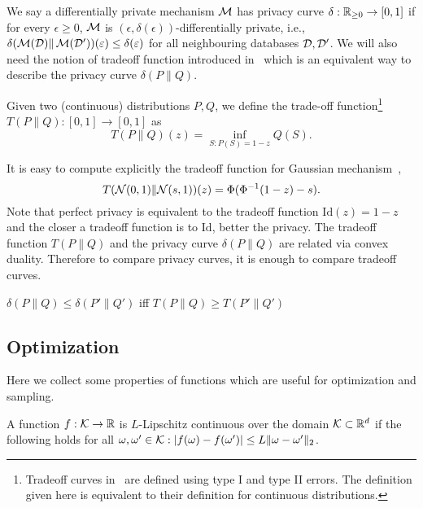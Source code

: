 We say a differentially private mechanism $\operatorname*{\mathcal{M}}$ has privacy curve $\delta:\mathbb{R}_{\ge0}\rightarrow[0,1]$ if for every $\epsilon\geq0$, $\operatorname*{\mathcal{M}}$ is $(\epsilon,\delta(\epsilon))$-differentially private, i.e., $\delta(\operatorname*{\mathcal{M}}(\mathcal D)\| \operatorname*{\mathcal{M}}(\mathcal D'))(\varepsilon)\leq \delta(\varepsilon)$ for all neighbouring databases $\mathcal D,\mathcal D'$.
We will also need the notion of tradeoff function introduced in~\cite{dong2019gaussian} which is an equivalent way to describe the privacy curve $\delta(P\|Q)$.
\begin{definition}
Given two (continuous) distributions $P,Q$, we define the trade-off function\footnote{Tradeoff curves in~\cite{dong2019gaussian} are defined using type I and type II errors. The definition given here is equivalent to their definition for continuous distributions.} $T(P\|Q):[0,1]\to [0,1]$ as $$T(P\|Q)(z)= \inf_{S:P(S)=1-z}Q(S).$$

It is easy to compute explicitly the tradeoff function for Gaussian mechanism~\cite{dong2019gaussian},
\begin{equation}
    \label{eqn:gaussian_tradeoff}
    T(\mathcal N(0,1)\|\mathcal N(s,1))(z)=\Phi(\Phi^{-1}(1-z)-s).
\end{equation}
Note that perfect privacy is equivalent to the tradeoff function $\mathrm{Id}(z)=1-z$ and the closer a tradeoff function is to $\mathrm{Id}$, better the privacy. The tradeoff function $T(P\|Q)$ and the privacy curve $\delta(P\|Q)$ are related via convex duality. Therefore to compare privacy curves, it is enough to compare tradeoff curves.

\begin{proposition}
\label{prop:delta_tradeoff}
$\delta(P\|Q)\le \delta(P'\|Q')$ iff $T(P\|Q)\ge T(P'\|Q')$
\end{proposition}


\end{definition}

\subsection{Optimization}
Here we collect some properties of functions which are useful for optimization and sampling.
\begin{definition}
A function $f:{\cal K}\rightarrow \mathbb{R}$ is $L$-Lipschitz continuous over the domain ${\cal K}\subset \mathbb{R}^{d}$ if the following holds for all $\omega,\omega'\in {\cal K}:|f(\omega)-f(\omega')|\leq L\|\omega-\omega'\|_2$. 
\end{definition}

